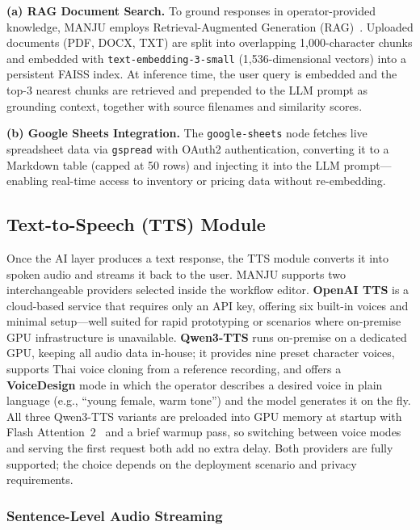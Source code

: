 \documentclass[10pt, a4paper, twocolumn]{article}
\begin{document}
\noindent\textbf{(a) RAG Document Search.}
\label{sec:rag}
To ground responses in operator-provided knowledge, MANJU employs
Retrieval-Augmented Generation (RAG)~\cite{lewis2020rag}.
Uploaded documents (PDF, DOCX, TXT) are split into overlapping
1{,}000-character chunks and embedded with
\texttt{text-embedding-3-small} (1{,}536-dimensional vectors) into a
persistent FAISS index.
At inference time, the user query is embedded and the top-3 nearest
chunks are retrieved and prepended to the LLM prompt as grounding
context, together with source filenames and similarity scores.

\noindent\textbf{(b) Google Sheets Integration.}
The \texttt{google-sheets} node fetches live spreadsheet data via \texttt{gspread} with OAuth2 authentication, converting it to a Markdown table (capped at 50 rows) and injecting it into the LLM prompt---enabling real-time access to inventory or pricing data without re-embedding.

\subsection{Text-to-Speech (TTS) Module}
\label{sec:tts}

Once the AI layer produces a text response, the TTS module converts it
into spoken audio and streams it back to the user.
MANJU supports two interchangeable providers selected inside the workflow
editor.
\textbf{OpenAI TTS} is a cloud-based service that requires only an API
key, offering six built-in voices and minimal setup---well suited for
rapid prototyping or scenarios where on-premise GPU infrastructure is
unavailable.
\textbf{Qwen3-TTS} runs on-premise on a dedicated GPU, keeping all
audio data in-house; it provides nine preset character voices, supports
Thai voice cloning from a reference recording, and offers a
\textbf{VoiceDesign} mode in which the operator describes a desired
voice in plain language (e.g., ``young female, warm tone'') and the
model generates it on the fly.
All three Qwen3-TTS variants are preloaded into GPU memory at startup
with Flash Attention~2~\cite{dao2022flashattention} and a brief warmup
pass, so switching between voice modes and serving the first request both
add no extra delay.
Both providers are fully supported; the choice depends on the
deployment scenario and privacy requirements.

\subsubsection{Sentence-Level Audio Streaming}
\end{document}
